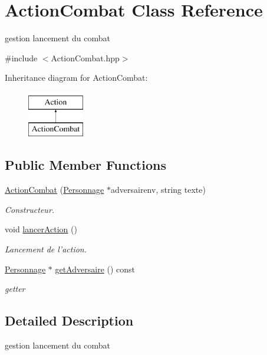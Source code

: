 \hypertarget{classActionCombat}{\section{Action\-Combat Class Reference}
\label{classActionCombat}
}


gestion lancement du combat  




{\ttfamily \#include $<$Action\-Combat.\-hpp$>$}

Inheritance diagram for Action\-Combat\-:\begin{figure}[H]
\begin{center}
\leavevmode
\includegraphics[height=2.000000cm]{classActionCombat}
\end{center}
\end{figure}
\subsection*{Public Member Functions}
\begin{DoxyCompactItemize}
\item 
\hyperlink{classActionCombat_a42da7041c76b15801f864c61e6e369d4}{Action\-Combat} (\hyperlink{classPersonnage}{Personnage} $\ast$adversairenv, string texte)
\begin{DoxyCompactList}\small\item\em Constructeur. \end{DoxyCompactList}\item 
void \hyperlink{classActionCombat_a5f84011b92f33ea68b67e861d2c1a222}{lancer\-Action} ()
\begin{DoxyCompactList}\small\item\em Lancement de l'action. \end{DoxyCompactList}\item 
\hyperlink{classPersonnage}{Personnage} $\ast$ \hyperlink{classActionCombat_ae9260ae03854f087cb60fd4a13dc395a}{get\-Adversaire} () const 
\begin{DoxyCompactList}\small\item\em getter \end{DoxyCompactList}\end{DoxyCompactItemize}


\subsection{Detailed Description}
gestion lancement du combat 

